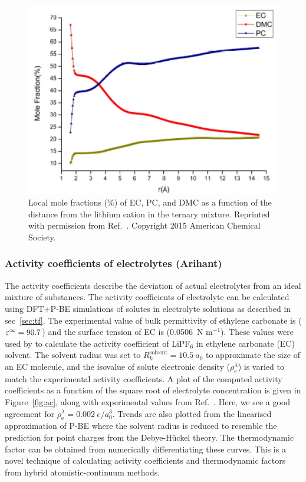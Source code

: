 \documentclass[../main.tex]{subfiles}
\begin{document}
\begin{figure}
    \centering
    \includegraphics[scale=0.3]{figures/solvents_ternary_mixute_le.jpg}
    \caption{Local mole fractions (\%) of EC, PC, and DMC as a function of the distance from the lithium cation in the ternary mixture. Reprinted with permission from Ref.~. Copyright 2015 American Chemical Society.}
    \label{fig:solvation}
\end{figure}

\subsubsection{Activity coefficients of electrolytes (Arihant)}
The activity coefficients describe the deviation of actual electrolytes from an ideal mixture of substances.\cite{Atkins2014} The activity coefficients of electrolyte can be calculated using DFT+P-BE simulations of solutes in electrolyte solutions as described in sec~\ref{sec:tf}. The experimental value of bulk permittivity of ethylene carbonate is ($\varepsilon^\infty=90.7$)\cite{Hall2015} and the surface tension of EC is (0.0506~N m$^{-1}$)\cite{Naejus2002}. These values were used by \citeauthor{Dziedzic2020} to calculate the activity coefficient of LiPF$_6$ in ethylene carbonate (EC) solvent. \cite{Dziedzic2020} The solvent radius was set to $R^\textrm{solvent}_k= 10.5~a_0$ to approximate the size of an EC molecule, and the isovalue of solute electronic density ($\rho_{\textrm{e}}^\lambda$) is varied to match the experimental activity coefficients. A plot of the computed activity coefficients as a function of the square root of electrolyte concentration is given in Figure~\ref{fig:ac}, along with experimental values from Ref.~. Here, we see a good agreement for $\rho_{\textrm{e}}^\lambda=0.002~e/a_0^3$. Trends are also plotted from the linearised approximation of P-BE where the solvent radius is reduced to resemble the prediction for point charges from the Debye-H\"uckel theory.\cite{debye1923theory} The thermodynamic factor can be obtained from numerically differentiating these curves. This is a novel technique of calculating activity coefficients and thermodynamic factors from hybrid atomistic-continuum methods.
\end{document}
